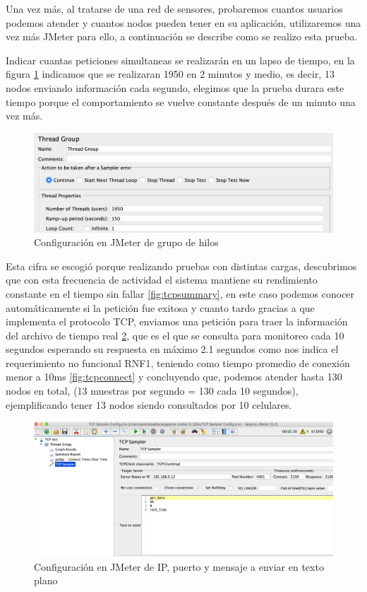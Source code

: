Una vez más, al tratarse de una red de sensores, probaremos cuantos usuarios podemos atender y cuantos nodos pueden tener en su aplicación, utilizaremos una vez más JMeter \citep{JMeter} para ello, a continuación se describe como se realizo esta prueba.

Indicar cuantas peticiones simultaneas se realizarán en un lapso de tiempo, en la figura \ref{fig:threadgroup} indicamos que se realizaran 1950 en 2 minutos y medio, es decir, 13 nodos enviando información cada segundo, elegimos que la prueba durara este tiempo porque el comportamiento se vuelve constante después de un minuto una vez más.

\begin{figure}[H]
	\centering
	\includegraphics[scale=.3]{Capitulo5/images/tread_group.png}
	\caption{Configuración en JMeter de grupo de hilos}
	\label{fig:threadgroup}
\end{figure} 

Esta cifra se escogió porque realizando pruebas con distintas cargas, descubrimos que con esta frecuencia de actividad el sistema mantiene su rendimiento constante en el tiempo sin fallar \ref{fig:tcpsummary}, en este caso podemos conocer automáticamente si la petición fue exitosa y cuanto tardo gracias a que implementa el protocolo TCP, enviamos una petición para traer la información del archivo de tiempo real \ref{fig:tcpconfig}, que es el que se consulta para monitoreo cada 10 segundos esperando su respuesta en máximo 2.1 segundos como nos indica el requerimiento no funcional RNF1, teniendo como tiempo promedio de conexión menor a 10ms \ref{fig:tcpconnect} y concluyendo que, podemos atender hasta 130 nodos en total, (13 muestras por segundo = 130 cada 10 segundos), ejemplificando tener 13 nodos siendo consultados por 10 celulares. 

\begin{figure}[H]
	\centering
	\includegraphics[scale=.3]{Capitulo5/images/real_time_test_config.png}
	\caption{Configuración en JMeter de IP, puerto y mensaje a enviar en texto plano}
	\label{fig:tcpconfig}
\end{figure} 

